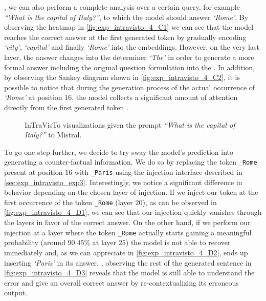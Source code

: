 , we can also perform a complete analysis over a certain query, for example \emph{``What is the capital of Italy?''}, to which the model should answer \emph{`Rome'}.
By observing the heatmap in \cref{fig:exp_intravisto_4_C1} we can see that the model reaches the correct answer at the first generated token by gradually encoding \emph{`city'}, \emph{`capital'} and finally \emph{`Rome'} into the embeddings.
However, on the very last layer, the answer changes into the determiner \emph{`The'} in order to generate a more formal answer including the original question formulation into the .
In addition, by observing the Sankey diagram shown in \cref{fig:exp_intravisto_4_C2}, it is possible to notice that during the generation process of the actual occurrence of \emph{`Rome'} at position $16$, the model collects a significant amount of attention directly from the first generated token .

\begin{figure}[t!]
    \centering
    \quad
    \caption{InTraVisTo visualizations given the prompt \emph{``What is the capital of Italy?''} to Mistral.}
    \label{fig:exp_intravisto_4_C}
\end{figure}

To go one step further, we decide to try  sway the model's prediction into generating a counter-factual information.
We do so by replacing the token \texttt{\_Rome} present at position $16$ with \texttt{\_Paris} using the injection interface described in \cref{sec:exp_intravisto_exp3}.
Interestingly, we notice a significant difference in behavior depending on the chosen layer of injection.
If we inject our token at the first occurrence of the token \texttt{\_Rome} (layer $20$), as can be observed in \cref{fig:exp_intravisto_4_D1}, we can see that our injection quickly vanishes through the layers in favor of the correct answer.
On the other hand, if we perform our injection at a layer where the token \texttt{\_Rome} actually starts gaining a meaningful probability (around $90.45\%$ at layer $25$) the model is not able to recover immediately and, as we can appreciate in \cref{fig:exp_intravisto_4_D2}, ends up inserting \emph{`Paris'} in its answer.
, observing the rest of the generated sentence in \cref{fig:exp_intravisto_4_D3} reveals that the model is still able to understand the  error and give an overall correct answer by re-contextualizing its erroneous output.

